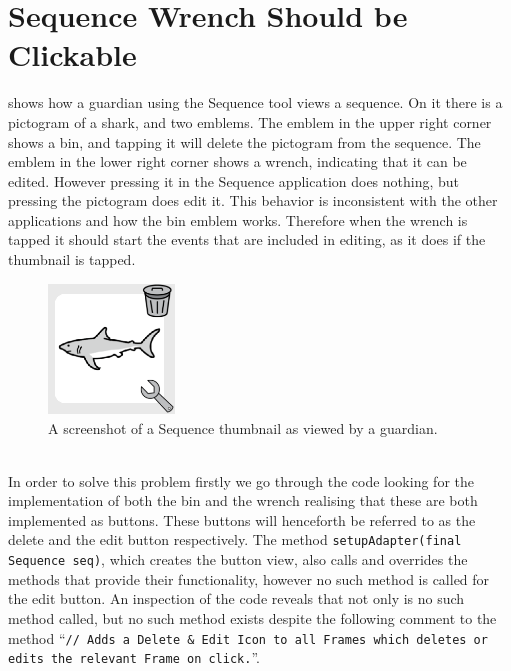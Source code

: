 \section{Sequence Wrench Should be Clickable}
\begin{center}
\end{center}

 shows how a guardian using the Sequence tool views a sequence.
On it there is a pictogram of a shark, and two emblems.
The emblem in the upper right corner shows a bin, and tapping it will delete the pictogram from the sequence.
The emblem in the lower right corner shows a wrench, indicating that it can be edited.
However pressing it in the Sequence application does nothing, but pressing the pictogram does edit it.
This behavior is inconsistent with the other applications and how the bin emblem works.
Therefore when the wrench is tapped it should start the events that are included in editing, as it does if the thumbnail is tapped.
\begin{figure}
    \centering
    \includegraphics[width=0.3\textwidth]{figures/img/screenshots/Sequence_pictogram.png}
    \caption{A screenshot of a Sequence thumbnail as viewed by a guardian.}\label{fig:seq_wrench}
    \vspace{-5pt}
\end{figure}
\\
In order to solve this problem firstly we go through the code looking for the implementation of both the bin and the wrench realising that these are both implemented as buttons.
These buttons will henceforth be referred to as the delete and the edit button respectively.
The method \texttt{setupAdapter(final Sequence seq)}, which creates the button view, also calls and overrides the methods that provide their functionality, however no such method is called for the edit button.
An inspection of the code reveals that not only is no such method called, but no such method exists despite the following comment to the method \enquote{\texttt{// Adds a Delete \& Edit Icon to all Frames which deletes or edits the relevant Frame on click.}}.

